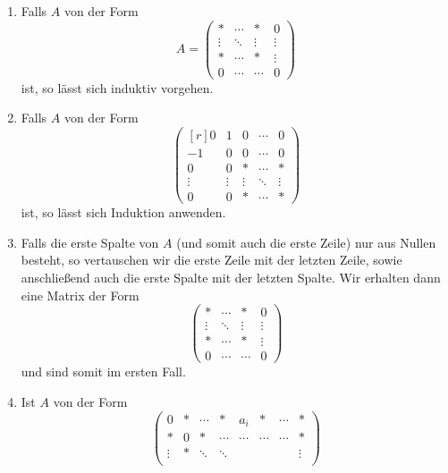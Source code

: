 \begin{enumerate}
  \item
    Falls $A$ von der Form
    \[
        A
      = \begin{pmatrix}
          *       & \cdots  & *       & 0       \\
          \vdots  & \ddots  & \vdots  & \vdots  \\
          *       & \cdots  & *       & \vdots  \\
          0       & \cdots  & \cdots  & 0
        \end{pmatrix}
    \]
    ist, so lässt sich induktiv vorgehen.
  \item
    Falls $A$ von der Form
    \[
    \begin{pmatrix*}[r]
       0      & 1       & 0       & \cdots  & 0       \\
      -1      & 0       & 0       & \cdots  & 0       \\
       0      & 0       & *       & \cdots  & *       \\
       \vdots & \vdots  & \vdots  & \ddots  & \vdots  \\
       0      & 0       & *       & \cdots  & *
    \end{pmatrix*}
    \]
    ist, so lässt sich Induktion anwenden.
  \item
    Falls die erste Spalte von $A$ (und somit auch die erste Zeile) nur aus Nullen besteht, so vertauschen wir die erste Zeile mit der letzten Zeile, sowie anschließend auch die erste Spalte mit der letzten Spalte.
    Wir erhalten dann eine Matrix der Form
    \[
      \begin{pmatrix}
        *       & \cdots  & *       & 0       \\
        \vdots  & \ddots  & \vdots  & \vdots  \\
        *       & \cdots  & *       & \vdots  \\
        0       & \cdots  & \cdots  & 0
      \end{pmatrix}
    \]
    und sind somit im ersten Fall.
  \item
    Ist $A$ von der Form
    \[
      \begin{pmatrix}
        0       & *       & \cdots  & *       & a_i     & *       & \cdots  & *       \\
        *       & 0       & *       & \cdots  & \cdots  & \cdots  & \cdots  & *       \\
        \vdots  & *       & \ddots  & \ddots  &         &         &         & \vdots  \\

\end{pmatrix}\]
\end{enumerate}

